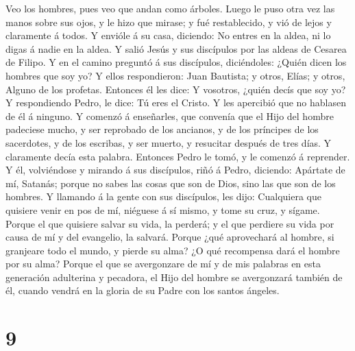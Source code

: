 Veo los hombres, pues veo que andan como árboles.  Luego
le puso otra vez las manos sobre sus ojos, y le hizo que mirase; y fué
restablecido, y vió de lejos y claramente á todos.  Y
envióle á su casa, diciendo: No entres en la aldea, ni lo digas á nadie
en la aldea.  Y salió Jesús y sus discípulos por las
aldeas de Cesarea de Filipo. Y en el camino preguntó á sus discípulos,
diciéndoles: ¿Quién dicen los hombres que soy yo?  Y
ellos respondieron: Juan Bautista; y otros, Elías; y otros, Alguno de
los profetas.  Entonces él les dice: Y vosotros, ¿quién
decís que soy yo? Y respondiendo Pedro, le dice: Tú eres el Cristo.
 Y les apercibió que no hablasen de él á ninguno.
 Y comenzó á enseñarles, que convenía que el Hijo del
hombre padeciese mucho, y ser reprobado de los ancianos, y de los
príncipes de los sacerdotes, y de los escribas, y ser muerto, y
resucitar después de tres días.  Y claramente decía esta
palabra. Entonces Pedro le tomó, y le comenzó á reprender.
 Y él, volviéndose y mirando á sus discípulos, riñó á
Pedro, diciendo: Apártate de mí, Satanás; porque no sabes las cosas que
son de Dios, sino las que son de los hombres.  Y llamando
á la gente con sus discípulos, les dijo: Cualquiera que quisiere venir
en pos de mí, niéguese á sí mismo, y tome su cruz, y sígame.
 Porque el que quisiere salvar su vida, la perderá; y el
que perdiere su vida por causa de mí y del evangelio, la salvará.
 Porque ¿qué aprovechará al hombre, si granjeare todo el
mundo, y pierde su alma?  ¿O qué recompensa dará el
hombre por su alma?  Porque el que se avergonzare de mí y
de mis palabras en esta generación adulterina y pecadora, el Hijo del
hombre se avergonzará también de él, cuando vendrá en la gloria de su
Padre con los santos ángeles.

\hypertarget{section-8}{%
\section{9}\label{section-8}}

